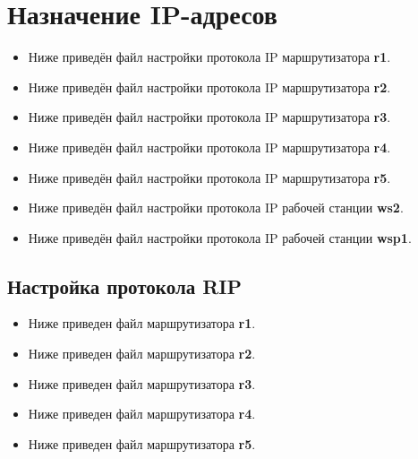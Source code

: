 \documentclass[a4paper,12pt]{article}
\begin{document}
\section{Назначение IP-адресов}
\begin{itemize}
\item Ниже приведён файл настройки протокола IP маршрутизатора \textbf{r1}.

\item Ниже приведён файл настройки протокола IP маршрутизатора \textbf{r2}.

\item Ниже приведён файл настройки протокола IP маршрутизатора \textbf{r3}.

\item Ниже приведён файл настройки протокола IP маршрутизатора \textbf{r4}.

\item Ниже приведён файл настройки протокола IP маршрутизатора \textbf{r5}.


\item Ниже приведён файл настройки протокола IP рабочей станции \textbf{ws2}.

\item Ниже приведён файл настройки протокола IP рабочей станции \textbf{wsp1}.

\end{itemize}



\subsection{Настройка протокола RIP}
\begin{itemize}
\item Ниже приведен файл  маршрутизатора \textbf{r1}.

\item Ниже приведен файл  маршрутизатора \textbf{r2}.

\item Ниже приведен файл  маршрутизатора \textbf{r3}.

\item Ниже приведен файл  маршрутизатора \textbf{r4}.

\item Ниже приведен файл  маршрутизатора \textbf{r5}.

\end{itemize}
\end{document}
